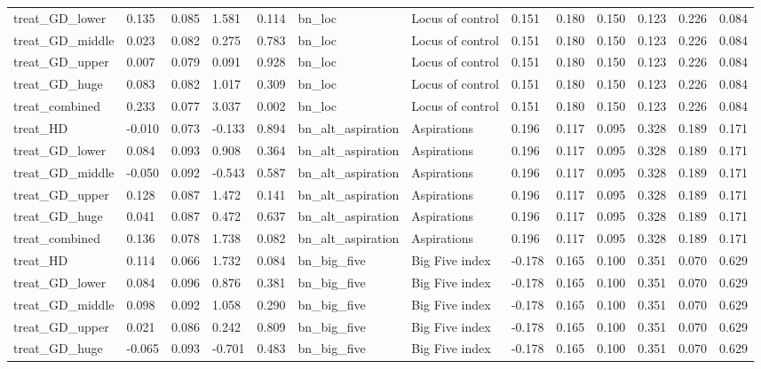 \begin{tabular}{lllllllllllll}
treat\_GD\_lower & 0.135 & 0.085 & 1.581 & 0.114 & bn\_loc & Locus of control & 0.151 & 0.180 & 0.150 & 0.123 & 0.226 & 0.084 \\
treat\_GD\_middle & 0.023 & 0.082 & 0.275 & 0.783 & bn\_loc & Locus of control & 0.151 & 0.180 & 0.150 & 0.123 & 0.226 & 0.084 \\
treat\_GD\_upper & 0.007 & 0.079 & 0.091 & 0.928 & bn\_loc & Locus of control & 0.151 & 0.180 & 0.150 & 0.123 & 0.226 & 0.084 \\
treat\_GD\_huge & 0.083 & 0.082 & 1.017 & 0.309 & bn\_loc & Locus of control & 0.151 & 0.180 & 0.150 & 0.123 & 0.226 & 0.084 \\
treat\_combined & 0.233 & 0.077 & 3.037 & 0.002 & bn\_loc & Locus of control & 0.151 & 0.180 & 0.150 & 0.123 & 0.226 & 0.084 \\
treat\_HD & -0.010 & 0.073 & -0.133 & 0.894 & bn\_alt\_aspiration & Aspirations & 0.196 & 0.117 & 0.095 & 0.328 & 0.189 & 0.171 \\
treat\_GD\_lower & 0.084 & 0.093 & 0.908 & 0.364 & bn\_alt\_aspiration & Aspirations & 0.196 & 0.117 & 0.095 & 0.328 & 0.189 & 0.171 \\
treat\_GD\_middle & -0.050 & 0.092 & -0.543 & 0.587 & bn\_alt\_aspiration & Aspirations & 0.196 & 0.117 & 0.095 & 0.328 & 0.189 & 0.171 \\
treat\_GD\_upper & 0.128 & 0.087 & 1.472 & 0.141 & bn\_alt\_aspiration & Aspirations & 0.196 & 0.117 & 0.095 & 0.328 & 0.189 & 0.171 \\
treat\_GD\_huge & 0.041 & 0.087 & 0.472 & 0.637 & bn\_alt\_aspiration & Aspirations & 0.196 & 0.117 & 0.095 & 0.328 & 0.189 & 0.171 \\
treat\_combined & 0.136 & 0.078 & 1.738 & 0.082 & bn\_alt\_aspiration & Aspirations & 0.196 & 0.117 & 0.095 & 0.328 & 0.189 & 0.171 \\
treat\_HD & 0.114 & 0.066 & 1.732 & 0.084 & bn\_big\_five & Big Five index & -0.178 & 0.165 & 0.100 & 0.351 & 0.070 & 0.629 \\
treat\_GD\_lower & 0.084 & 0.096 & 0.876 & 0.381 & bn\_big\_five & Big Five index & -0.178 & 0.165 & 0.100 & 0.351 & 0.070 & 0.629 \\
treat\_GD\_middle & 0.098 & 0.092 & 1.058 & 0.290 & bn\_big\_five & Big Five index & -0.178 & 0.165 & 0.100 & 0.351 & 0.070 & 0.629 \\
treat\_GD\_upper & 0.021 & 0.086 & 0.242 & 0.809 & bn\_big\_five & Big Five index & -0.178 & 0.165 & 0.100 & 0.351 & 0.070 & 0.629 \\
treat\_GD\_huge & -0.065 & 0.093 & -0.701 & 0.483 & bn\_big\_five & Big Five index & -0.178 & 0.165 & 0.100 & 0.351 & 0.070 & 0.629 \\

\end{tabular}
